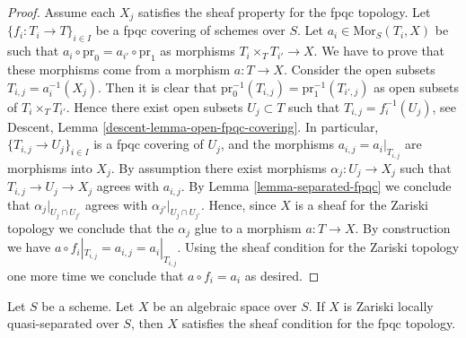\begin{proof}
Assume each $X_j$ satisfies the sheaf property for the fpqc topology.
Let $\{f_i : T_i \to T\}_{i \in I}$ be a fpqc covering of schemes over $S$.
Let $a_i \in \text{Mor}_S(T_i, X)$ be such that
$a_i \circ \text{pr}_0 = a_{i'} \circ \text{pr}_1$ as morphisms
$T_i \times_T T_{i'} \to X$. We have to prove that these morphisms
come from a morphism $a : T \to X$. Consider the open subsets
$T_{i, j} = a_i^{-1}(X_j)$. Then it is clear that
$\text{pr}_0^{-1}(T_{i, j}) = \text{pr}_1^{-1}(T_{i', j})$ as open
subsets of $T_i \times_T T_{i'}$. Hence there exist open subsets
$U_j \subset T$ such that $T_{i, j} = f_i^{-1}(U_j)$, see
Descent, Lemma \ref{descent-lemma-open-fpqc-covering}.
In particular, $\{T_{i, j} \to U_j\}_{i \in I}$ is a fpqc covering
of $U_j$, and the morphisms $a_{i, j} = a_i|_{T_{i, j}}$ are morphisms
into $X_j$. By assumption there exist morphisms $\alpha_j : U_j \to X_j$
such that $T_{i, j} \to U_j \to X_j$ agrees with $a_{i, j}$.
By Lemma \ref{lemma-separated-fpqc} we conclude that
$\alpha_j|_{U_j \cap U_{j'}}$ agrees with $\alpha_{j'}|_{U_j \cap U_{j'}}$.
Hence, since $X$ is a sheaf for the Zariski topology we conclude that
the $\alpha_j$ glue to a morphism $a : T \to X$.
By construction we have $a \circ f_i|_{T_{i, j}} = a_{i, j} = a_i|_{T_{i, j}}$.
Using the sheaf condition for the Zariski topology one more time we
conclude that $a \circ f_i = a_i$ as desired.
\end{proof}

\begin{lemma}
\label{lemma-sheaf-fpqc-quasi-separated}
Let $S$ be a scheme.
Let $X$ be an algebraic space over $S$.
If $X$ is Zariski locally quasi-separated over $S$, then $X$ satisfies
the sheaf condition for the fpqc topology.
\end{lemma}

